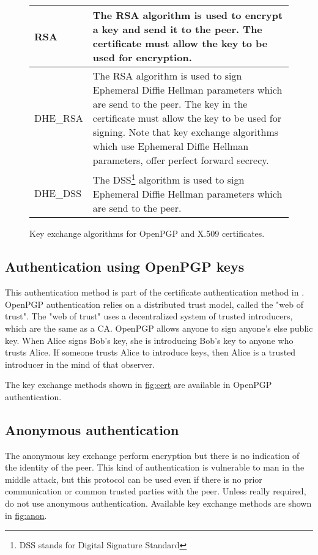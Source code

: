 \begin{figure}[hbtp]
\begin{tabular}{|l|p{9cm}|}
\hline
RSA & The RSA algorithm is used to encrypt a key and send it to the peer.
The certificate must allow the key to be used for encryption.
\\
\hline
DHE\_RSA & The RSA algorithm is used to sign Ephemeral Diffie Hellman
parameters which are send to the peer. The key in the certificate must allow
the key to be used for signing. Note that key exchange algorithms which use
Ephemeral Diffie Hellman parameters, offer perfect forward secrecy.
\\
\hline
DHE\_DSS & The DSS\footnote{DSS stands for Digital Signature Standard} algorithm is used to sign Ephemeral Diffie Hellman
parameters which are send to the peer. 
\\
\hline
\end{tabular}

\caption{Key exchange algorithms for OpenPGP and X.509 certificates.}
\label{fig:cert}

\end{figure}

\subsection{Authentication using OpenPGP keys}
This authentication method is part of the certificate authentication
method in \gnutls{}.
OpenPGP authentication relies on a distributed trust model, called the "web
of trust". The "web of trust" uses a decentralized system of trusted
introducers, which are the same as a CA. OpenPGP allows anyone to sign
anyone's else public key. When Alice signs Bob's key, she is introducing 
Bob's key to anyone who trusts Alice. If someone trusts Alice to introduce
keys, then Alice is a trusted introducer in the mind of that observer.
\par

The key exchange methods shown in \hyperref{figure}{figure }{}{fig:cert} are
available in OpenPGP authentication. 


\subsection{Anonymous authentication}
The anonymous key exchange perform encryption but there is no indication of the 
identity of the peer. This kind of authentication is vulnerable to man in the middle attack, 
but this protocol can be used even if there is no prior communication or common trusted
parties with the peer. Unless really required, do not use anonymous authentication.
Available key exchange methods are shown in \hyperref{figure}{figure }{}{fig:anon}.

